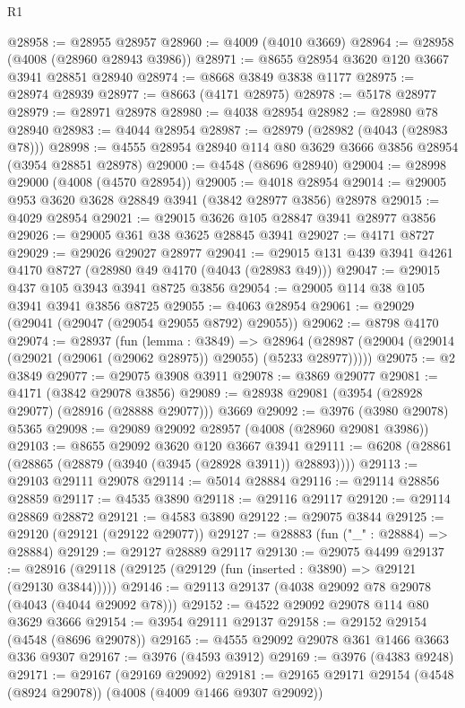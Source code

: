 \begin{lexlean}{R1}
\begin{coremodule}
@28958 := @28955 @28957
@28960 := @4009 (@4010 @3669)
@28964 := @28958 (@4008 (@28960 @28943 @3986))
@28971 := @8655 @28954 @3620 @120 @3667 @3941 @28851 @28940
@28974 := @8668 @3849 @3838 @1177
@28975 := @28974 @28939
@28977 := @8663 (@4171 @28975)
@28978 := @5178 @28977
@28979 := @28971 @28978
@28980 := @4038 @28954
@28982 := @28980 @78 @28940
@28983 := @4044 @28954
@28987 := @28979 (@28982 (@4043 (@28983 @78)))
@28998 := @4555 @28954 @28940 @114 @80 @3629 @3666 @3856 @28954 (@3954 @28851 @28978)
@29000 := @4548 (@8696 @28940)
@29004 := @28998 @29000 (@4008 (@4570 @28954))
@29005 := @4018 @28954
@29014 := @29005 @953 @3620 @3628 @28849 @3941 (@3842 @28977 @3856) @28978
@29015 := @4029 @28954
@29021 := @29015 @3626 @105 @28847 @3941 @28977 @3856
@29026 := @29005 @361 @38 @3625 @28845 @3941
@29027 := @4171 @8727
@29029 := @29026 @29027 @28977
@29041 := @29015 @131 @439 @3941 @4261 @4170 @8727 (@28980 @49 @4170 (@4043 (@28983 @49)))
@29047 := @29015 @437 @105 @3943 @3941 @8725 @3856
@29054 := @29005 @114 @38 @105 @3941 @3941 @3856 @8725
@29055 := @4063 @28954
@29061 := @29029 (@29041 (@29047 (@29054 @29055 @8792) @29055))
@29062 := @8798 @4170
@29074 := @28937
    (fun (lemma : @3849) =>
    @28964 (@28987 (@29004 (@29014 (@29021 (@29061 (@29062 @28975)) @29055) (@5233 @28977)))))
@29075 := @2 @3849
@29077 := @29075 @3908 @3911
@29078 := @3869 @29077
@29081 := @4171 (@3842 @29078 @3856)
@29089 := @28938 @29081 (@3954 (@28928 @29077) (@28916 (@28888 @29077))) @3669
@29092 := @3976 (@3980 @29078) @5365
@29098 := @29089 @29092 @28957 (@4008 (@28960 @29081 @3986))
@29103 := @8655 @29092 @3620 @120 @3667 @3941
@29111 := @6208 (@28861 (@28865 (@28879 (@3940 (@3945 (@28928 @3911)) @28893))))
@29113 := @29103 @29111 @29078
@29114 := @5014 @28884
@29116 := @29114 @28856 @28859
@29117 := @4535 @3890
@29118 := @29116 @29117
@29120 := @29114 @28869 @28872
@29121 := @4583 @3890
@29122 := @29075 @3844
@29125 := @29120 (@29121 (@29122 @29077))
@29127 := @28883 (fun ("_" : @28884) => @28884)
@29129 := @29127 @28889 @29117
@29130 := @29075 @4499
@29137 := @28916 (@29118 (@29125 (@29129 (fun (inserted : @3890) => @29121 (@29130 @3844)))))
@29146 := @29113 @29137 (@4038 @29092 @78 @29078 (@4043 (@4044 @29092 @78)))
@29152 := @4522 @29092 @29078 @114 @80 @3629 @3666
@29154 := @3954 @29111 @29137
@29158 := @29152 @29154 (@4548 (@8696 @29078))
@29165 := @4555 @29092 @29078 @361 @1466 @3663 @336 @9307
@29167 := @3976 (@4593 @3912)
@29169 := @3976 (@4383 @9248)
@29171 := @29167 (@29169 @29092)
@29181 := @29165 @29171 @29154 (@4548 (@8924 @29078)) (@4008 (@4009 @1466 @9307 @29092))

\end{coremodule}
\end{lexlean}
